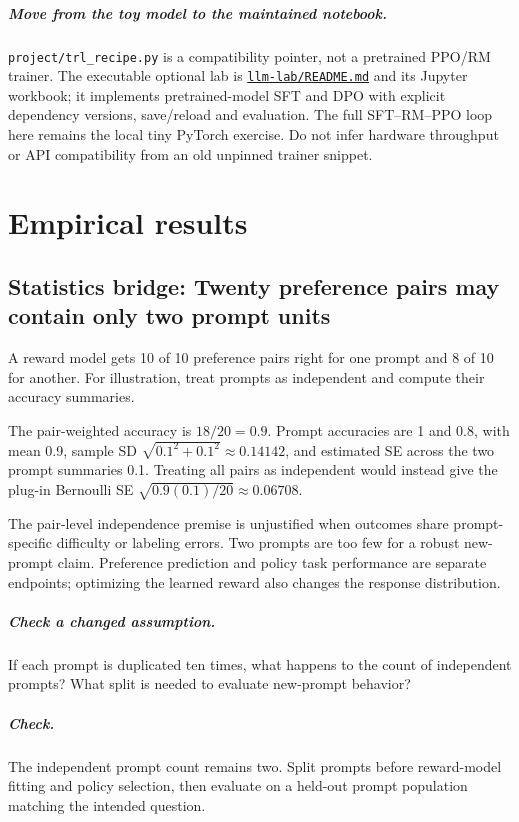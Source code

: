 \documentclass[11pt,oneside]{scrbook}
\begin{document}
\paragraph{Move from the toy model to the maintained notebook.}
\texttt{project/trl\_recipe.py} is a compatibility pointer, not a pretrained
PPO/RM trainer. The executable optional lab is
\href{../llm-lab/README.md}{\texttt{llm-lab/README.md}} and its Jupyter workbook;
it implements pretrained-model SFT and DPO with explicit dependency versions,
save/reload and evaluation. The full SFT--RM--PPO loop here remains the local
tiny PyTorch exercise. Do not infer hardware throughput or API compatibility
from an old unpinned trainer snippet.

\chapter{Empirical results}

\section{Statistics bridge: Twenty preference pairs may contain only two prompt units}
\begin{example}
A reward model gets 10 of 10 preference pairs right for one prompt and 8 of 10 for another. For illustration, treat prompts as independent and compute their accuracy summaries.

The pair-weighted accuracy is $18/20=0.9$. Prompt accuracies are 1 and 0.8, with mean 0.9, sample SD $\sqrt{0.1^2+0.1^2}\approx0.14142$, and estimated SE across the two prompt summaries 0.1. Treating all pairs as independent would instead give the plug-in Bernoulli SE $\sqrt{0.9(0.1)/20}\approx0.06708$.
\end{example}
The pair-level independence premise is unjustified when outcomes share prompt-specific difficulty or labeling errors. Two prompts are too few for a robust new-prompt claim. Preference prediction and policy task performance are separate endpoints; optimizing the learned reward also changes the response distribution.

\paragraph{Check a changed assumption.} If each prompt is duplicated ten times, what happens to the count of independent prompts? What split is needed to evaluate new-prompt behavior?
\paragraph{Check.} The independent prompt count remains two. Split prompts before reward-model fitting and policy selection, then evaluate on a held-out prompt population matching the intended question.
\end{document}
